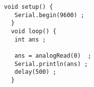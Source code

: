 \begin{verbatim}
  void setup() {
     Serial.begin(9600) ;
    }
    void loop() {
     int ans ;

     ans = analogRead(0)  ;
     Serial.println(ans) ;
     delay(500) ;
    }	
\end{verbatim}
    
